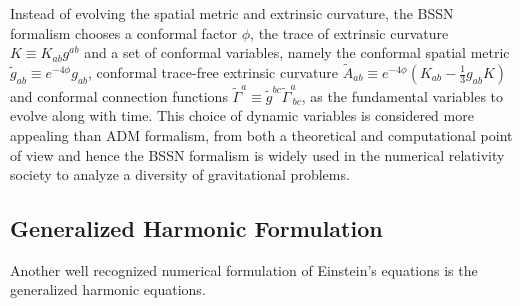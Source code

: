 Instead of evolving the spatial metric and extrinsic curvature, the BSSN formalism chooses a conformal factor $\phi$, the trace of extrinsic curvature $K \equiv K_{ab}g^{ab}$ and a set of conformal variables, namely the conformal spatial metric ${\tilde g}_{ab} \equiv e^{-4\phi}g_{ab}$, conformal trace-free extrinsic curvature ${\tilde A}_{ab} \equiv e^{-4\phi}(K_{ab} - \frac{1}{3}g_{ab}K)$ and conformal connection functions ${\tilde \Gamma}^{a} \equiv {\tilde g}^{bc}{\tilde \Gamma}^{a}_{~bc}$, as the fundamental variables to evolve along with time. This choice of dynamic variables is considered more appealing than ADM formalism, from both a theoretical and computational point of view and hence the BSSN formalism is widely used in the numerical relativity society to analyze a diversity of gravitational problems. 

\subsection{Generalized Harmonic Formulation}
Another well recognized numerical formulation of Einstein's equations is the generalized harmonic equations\cite{Friedrich:1985, Garfinkle:2001ni}. 